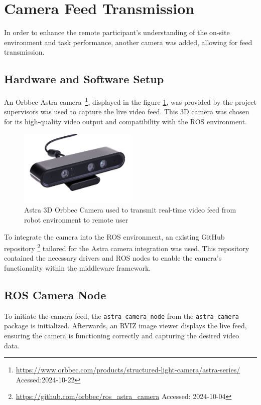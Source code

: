 \section{Camera Feed Transmission}

In order to enhance the remote participant's understanding of the on-site environment and task performance, another camera was added, allowing for feed transmission. 

\subsection{Hardware and Software Setup}
An Orbbec Astra camera~\footnote{\url{https://www.orbbec.com/products/structured-light-camera/astra-series/} Acessed:2024-10-22}, displayed in the figure \ref{fig:astra-camera}, was provided by the project supervisors was used to capture the live video feed. This 3D camera was chosen for its high-quality video output and compatibility with the \ac{ROS} environment.

\begin{figure}[h]
    \centering
    \includegraphics[width=0.5\textwidth]{figs/AstraSeries_3.jpg}
    \caption{Astra 3D Orbbec Camera used to transmit real-time video feed from robot environment to remote user}
    \label{fig:astra-camera}
\end{figure}
\FloatBarrier

To integrate the camera into the \ac{ROS} environment, an existing GitHub repository \footnote{\url{https://github.com/orbbec/ros_astra_camera} Accessed: 2024-10-04} tailored for the Astra camera integration was used. This repository contained the necessary drivers and \ac{ROS} nodes to enable the camera's functionality within the middleware framework.


\subsection{ROS Camera Node}
To initiate the camera feed, the \texttt{astra\_camera\_node} from the \texttt{astra\_camera} package is initialized. Afterwards, an RVIZ image viewer displays the live feed, ensuring the camera is functioning correctly and capturing the desired video data.

